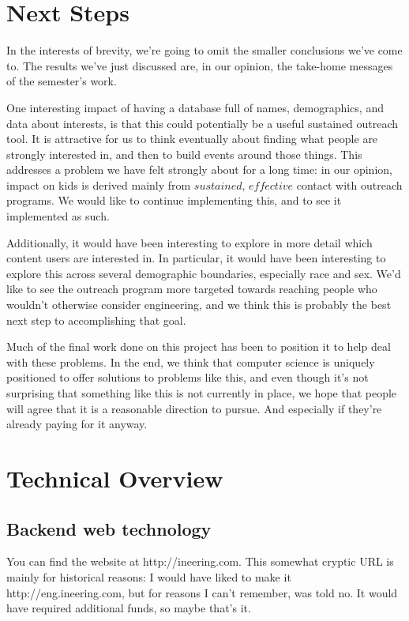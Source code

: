 \documentclass[11pt,a4paper]{article}
\begin{document}
\section{Next Steps}

In the interests of brevity, we're going to omit the smaller conclusions we've come to. The results we've just discussed are, in our opinion, the take-home messages of the semester's work.

One interesting impact of having a database full of names, demographics, and data about interests, is that this could potentially be a useful sustained outreach tool. It is attractive for us to think eventually about finding what people are strongly interested in, and then to build events around those things. This addresses a problem we have felt strongly about for a long time: in our opinion, impact on kids is derived mainly from $\textit{sustained, effective}$ contact with outreach programs. We would like to continue implementing this, and to see it implemented as such.

Additionally, it would have been interesting to explore in more detail which content users are interested in. In particular, it would have been interesting to explore this across several demographic boundaries, especially race and sex. We'd like to see the outreach program more targeted towards reaching people who wouldn't otherwise consider engineering, and we think this is probably the best next step to accomplishing that goal.

Much of the final work done on this project has been to position it to help deal with these problems. In the end, we think that computer science is uniquely positioned to offer solutions to problems like this, and even though it's not surprising that something like this is not currently in place, we hope that people will agree that it is a reasonable direction to pursue. And especially if they're already paying for it anyway.

\section{Technical Overview}

\subsection{Backend web technology}

You can find the website at http://ineering.com. This somewhat cryptic URL is mainly for historical reasons: I would have liked to make it http://eng.ineering.com, but for reasons I can't remember, was told no. It would have required additional funds, so maybe that's it.
\end{document}
